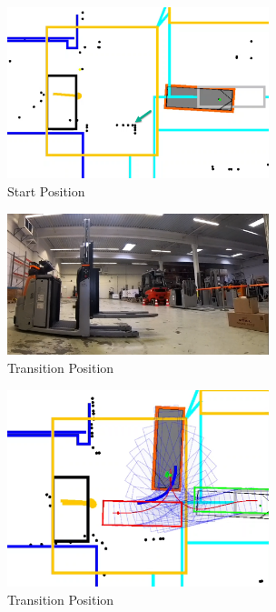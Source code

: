 \begin{figure}[H]
    \begin{center}
        \includegraphics[width=3in]{images/Chap3/Test2_ObsLeftVehic/Start_simu.png} %
        \caption{Start Position}
        \label{OptResult13}
        \end{center}    
\end{figure}

\begin{figure}[H]
    \begin{center}
        \includegraphics[width=3in]{images/Chap3/Test2_ObsLeftVehic/Transition_real.png} %
        \caption{Transition Position}
        \label{OptResult14}
        \end{center}    
\end{figure}

\begin{figure}[H]
    \begin{center}
        \includegraphics[width=3in]{images/Chap3/Test2_ObsLeftVehic/Transition_simu.png} %
        \caption{Transition Position}
        \label{OptResult15}
        \end{center}    
\end{figure}

